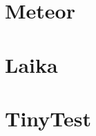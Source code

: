 \documentclass[brudnopis]{xmgr}
\begin{document}

\chapter{Meteor}


\chapter{Laika}


\chapter{TinyTest}







\listoftables

\listoffigures

\oswiadczenie
\end{document}
